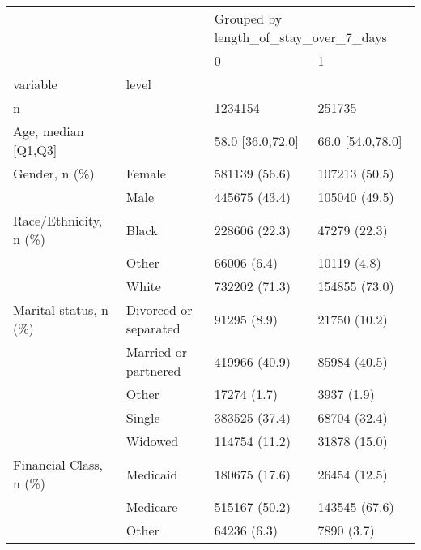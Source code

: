 \begin{tabular}{llll}
\toprule
                                       &   & \multicolumn{2}{l}{Grouped by length\_of\_stay\_over\_7\_days} \\
                                       &   &                                     0 &                  1 \\
variable & level &                                       &                    \\
\midrule
n &   &                               1234154 &             251735 \\
Age, median [Q1,Q3] &   &                      58.0 [36.0,72.0] &   66.0 [54.0,78.0] \\
Gender, n (\%) & Female &                         581139 (56.6) &      107213 (50.5) \\
                                       & Male &                         445675 (43.4) &      105040 (49.5) \\
Race/Ethnicity, n (\%) & Black &                         228606 (22.3) &       47279 (22.3) \\
                                       & Other &                           66006 (6.4) &        10119 (4.8) \\
                                       & White &                         732202 (71.3) &      154855 (73.0) \\
Marital status, n (\%) & Divorced or separated &                           91295 (8.9) &       21750 (10.2) \\
                                       & Married or partnered &                         419966 (40.9) &       85984 (40.5) \\
                                       & Other &                           17274 (1.7) &         3937 (1.9) \\
                                       & Single &                         383525 (37.4) &       68704 (32.4) \\
                                       & Widowed &                         114754 (11.2) &       31878 (15.0) \\
Financial Class, n (\%) & Medicaid &                         180675 (17.6) &       26454 (12.5) \\
                                       & Medicare &                         515167 (50.2) &      143545 (67.6) \\
                                       & Other &                           64236 (6.3) &         7890 (3.7) \\

\end{tabular}
